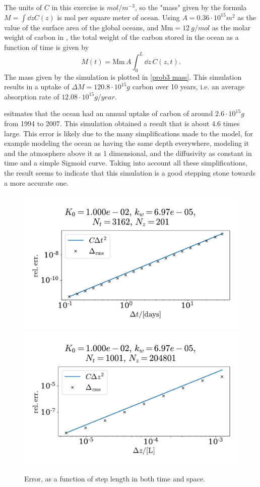 \documentclass{article}
\begin{document}
    The units of $C$ in this exercise is $\si{mol / m^{-3}}$, so the "mass" given by the formula $M = \int \dd z C(z)$ is mol per square meter of ocean. Using $A = 0.36 \cdot 10^{15}\si{m^2}$ as the value of the surface area of the global oceans, and $\mathrm{Mm} = \SI{12}{g / mol}$ as the molar weight of carbon in , the total weight of the carbon stored in the ocean as a function of time is given by
    \begin{equation*}
        M(t) = \mathrm{Mm} \, A \int_0^L \dd z \, C(z, t).
    \end{equation*}
    The mass given by the simulation is plotted in \autoref{prob3 mass}. This simulation results in a uptake of $\Delta M = 120.8 \cdot 10^{15} \si{g}$ carbon over 10 years, i.e. an average absorption rate of $12.08 \cdot 10^{15} \si{g/year}$. 

    \citeauthor{Gruber1193} \cite{Gruber1193} esitmates that the ocean had an annual uptake of carbon of around $2.6\cdot 10^{15}\si{g}$ from 1994 to 2007. This simulation obtained a result that is about 4.6 times large. This error is likely due to the many simplifications made to the model, for example modeling the ocean as having the same depth everywhere, modeling it and the atmosphere above it as 1 dimensional, and the diffusivity as constant in time and a simple Sigmoid curve. Taking into account all these simplifications, the result seems to indicate that this simulation is a good stepping stone towards a more accurate one.



    \begin{figure}[H]
        \centering
        \includegraphics[width=.49\textwidth]{../plots/prob3_conv_test_t}
        \includegraphics[width=.49\textwidth]{../plots/prob3_conv_test_z}
        \caption{Error, as a function of step length in both time and space.}
        \label{prob3 conv}
    \end{figure}
\end{document}
